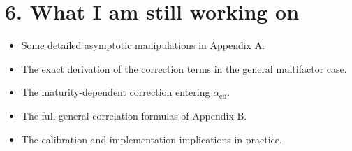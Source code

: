 \documentclass[11pt]{article}
\begin{document}
\section*{6. What I am still working on}

\begin{itemize}
    \item Some detailed asymptotic manipulations in Appendix A.
    \item The exact derivation of the correction terms in the general multifactor case.
    \item The maturity-dependent correction entering \(\alpha_{\mathrm{eff}}\).
    \item The full general-correlation formulas of Appendix B.
    \item The calibration and implementation implications in practice.
\end{itemize}
\end{document}
